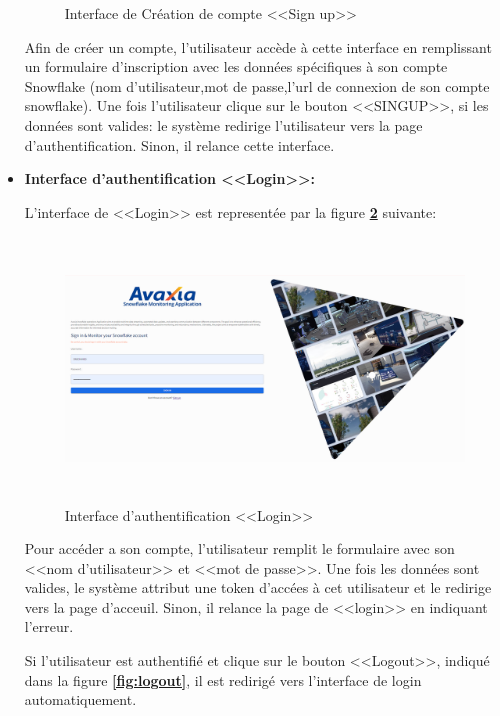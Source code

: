 \begin{itemize}
\begin{figure}[H]
            \caption{Interface de Création de compte <<Sign up>> }
                \label{fig:signup}
            \end{figure}
            \par Afin de créer un compte, l'utilisateur accède à cette interface en remplissant un formulaire d'inscription avec les données spécifiques à son compte Snowflake (nom d'utilisateur,mot de passe,l'url de connexion de son compte snowflake).
            Une fois l'utilisateur clique sur le bouton <<SINGUP>>, si les données sont valides: le système redirige l'utilisateur vers la page d'authentification. Sinon, il relance cette interface.
            \item \textbf{Interface d'authentification  <<Login>>:}
            \par L'interface de <<Login>> est representée par la figure \textbf{\ref{fig:login}} suivante:
            \begin{figure}[H]
                \centering
                \includegraphics[width =1\linewidth , height=7cm]{img/captures/auth/login.png}
                \caption{Interface d'authentification  <<Login>>}
                    \label{fig:login}
                \end{figure}
                \par Pour accéder a son compte, l'utilisateur remplit le formulaire avec son <<nom d'utilisateur>> et <<mot de passe>>. Une fois les données sont valides, le système attribut une token d'accées à cet utilisateur et le redirige vers la page d'acceuil. Sinon, il relance la page de <<login>> en indiquant l'erreur.
                \par Si l'utilisateur est authentifié et clique sur le bouton <<Logout>>, indiqué dans la figure \textbf{\ref{fig:logout}}, il est redirigé vers l'interface de login automatiquement.
                \begin{figure}[H]

\end{figure}
\end{itemize}
